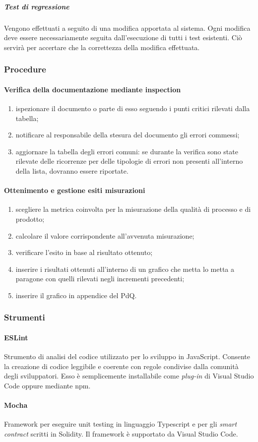 \subparagraph*{Test di regressione}
Vengono effettuati a seguito di una modifica apportata al sistema. Ogni modifica deve essere necessariamente seguita dall'esecuzione di tutti i test esistenti. Ciò servirà per accertare che la correttezza della modifica effettuata. 


\subsubsection{Procedure}
\paragraph{Verifica della documentazione mediante inspection}
\begin{enumerate}
	\item ispezionare il documento o parte di esso seguendo i punti critici rilevati dalla tabella;
	\item notificare al responsabile della stesura del documento gli errori commessi;
	\item aggiornare la tabella degli errori comuni: se durante la verifica sono state rilevate delle ricorrenze per delle tipologie di errori non presenti all'interno della lista, dovranno essere riportate.
\end{enumerate}
\paragraph{Ottenimento e gestione esiti misurazioni}
\begin{enumerate}
	\item scegliere la metrica coinvolta per la misurazione della qualità di processo e di prodotto;
	\item calcolare il valore corrispondente all'avvenuta misurazione;
	\item verificare l'esito in base al risultato ottenuto;
	\item inserire i risultati ottenuti all'interno di un grafico che metta lo metta a paragone con quelli rilevati negli incrementi precedenti;
	\item inserire il grafico in appendice del PdQ. 
\end{enumerate}

\subsubsection{Strumenti}
\paragraph{ESLint}
Strumento di analisi del codice utilizzato per lo sviluppo in JavaScript. Consente la creazione di codice leggibile e coerente con regole condivise dalla comunità degli sviluppatori. Esso è semplicemente installabile come \textit{plug-in\glo} di Visual Studio Code oppure mediante npm. 

\paragraph{Mocha}
Framework per eseguire unit testing in linguaggio Typescript e per gli \textit{smart contract\glo} scritti in Solidity. Il framework è supportato da Visual Studio Code.
